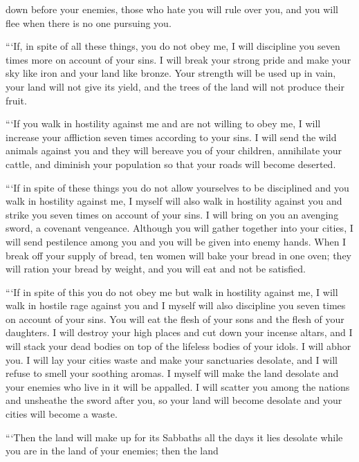 {down before
your enemies,
those who hate
you will rule
over you, and you will flee
when there is no
one pursuing you.
\par }{\PP {}“‘If,
in spite
of all
these
things, you do not
obey
me,
I will discipline
you seven
times more
on
account of your sins.
I will break
your strong
pride
and make
your sky
like iron
and your land
like bronze.
Your strength
will be used up in vain,
your land
will not
give
its yield,
and the trees
of the land
will not
produce
their fruit.
\par }{\PP {}“‘If
you walk
in hostility
against me and are not
willing
to obey
me,
I will increase
your affliction
seven
times according to your sins.
I will send
the
wild
animals
against you and they will bereave
you of your children, annihilate
your cattle,
and diminish
your population so that your roads
will become deserted.
\par }{\PP {}“‘If
in spite of these
things you do not
allow yourselves to be disciplined
and you walk
in hostility against me,
I myself
will also walk
in hostility
against you and strike
you seven
times on
account of your sins.
I will bring
on
you an avenging
sword,
a covenant
vengeance.
Although you will gather together
into
your cities,
I will send
pestilence
among
you and you will be given
into enemy
hands.
When I break
off your supply
of bread,
ten
women
will bake
your bread
in one
oven;
they will ration
your bread
by weight,
and you will eat
and not
be satisfied.
\par }{\PP {}“‘If
in spite of this
you do not
obey
me
but walk
in hostility against me,
I will walk
in hostile
rage
against you and I myself
will also discipline
you seven
times on
account of your sins.
You will eat
the flesh
of your sons
and the flesh
of your daughters.
I will destroy
your high places
and cut down
your incense altars,
and I will stack
your dead bodies
on
top of the lifeless bodies
of your idols.
I will abhor
you.
I will lay
your cities
waste
and make your sanctuaries
desolate,
and I will refuse
to smell
your soothing
aromas.
I myself
will make
the land
desolate
and your enemies
who live
in it will be appalled.
I will scatter
you among the nations
and unsheathe
the sword
after
you, so
your land
will become desolate
and your cities
will become
a waste.
\par }{\PP {}“‘Then
the land
will make up
for its
Sabbaths
all
the days
it lies desolate
while you
are in the land
of your enemies;
then
the land
}

